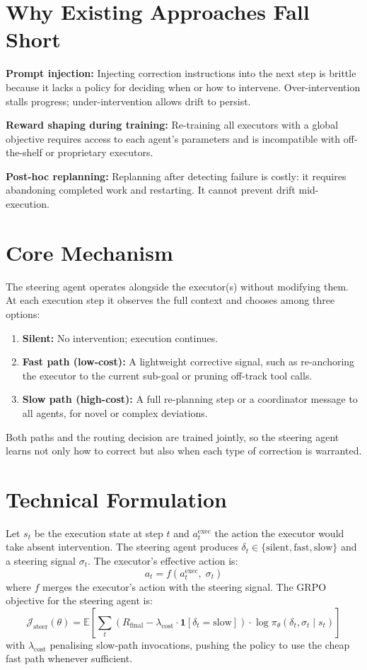 \documentclass[10pt,twocolumn]{article}
\begin{document}
\section{Why Existing Approaches Fall Short}

\textbf{Prompt injection:} Injecting correction instructions into the next
step is brittle because it lacks a policy for deciding when or how to
intervene. Over-intervention stalls progress; under-intervention allows drift
to persist.

\textbf{Reward shaping during training:} Re-training all executors with a
global objective requires access to each agent's parameters and is
incompatible with off-the-shelf or proprietary executors.

\textbf{Post-hoc replanning:} Replanning after detecting failure is costly:
it requires abandoning completed work and restarting. It cannot prevent drift
mid-execution.

\section{Core Mechanism}

The steering agent operates alongside the executor(s) without modifying them.
At each execution step it observes the full context and chooses among three
options:

\begin{enumerate}[itemsep=2pt,parsep=0pt]
  \item \textbf{Silent:} No intervention; execution continues.
  \item \textbf{Fast path (low-cost):} A lightweight corrective signal,
    such as re-anchoring the executor to the current sub-goal or pruning
    off-track tool calls.
  \item \textbf{Slow path (high-cost):} A full re-planning step or a
    coordinator message to all agents, for novel or complex deviations.
\end{enumerate}

Both paths and the routing decision are trained jointly, so the steering
agent learns not only how to correct but also when each type of correction
is warranted.

\section{Technical Formulation}

Let $s_t$ be the execution state at step $t$ and $a^{\text{exec}}_t$ the
action the executor would take absent intervention. The steering agent
produces $\delta_t \in \{\text{silent}, \text{fast}, \text{slow}\}$ and
a steering signal $\sigma_t$. The executor's effective action is:
\[
a_t = f(a^{\text{exec}}_t,\; \sigma_t)
\]
where $f$ merges the executor's action with the steering signal. The GRPO
objective for the steering agent is:
\[
\mathcal{J}_{\text{steer}}(\theta) = \mathbb{E}\!\left[\sum_t \!\left(R_{\text{final}}
  - \lambda_{\text{cost}} \cdot \mathbf{1}[\delta_t = \text{slow}]\right)
  \cdot \log \pi_\theta(\delta_t, \sigma_t \mid s_t)\right]
\]
with $\lambda_{\text{cost}}$ penalising slow-path invocations, pushing the
policy to use the cheap fast path whenever sufficient.
\end{document}
